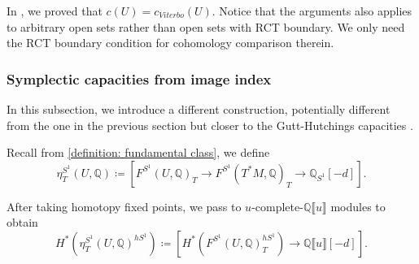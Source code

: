 \documentclass[11pt]{amsart}
\numberwithin{equation}{section}
\theoremstyle{plain}
\theoremstyle{definition}
\theoremstyle{remark}
\newcommand{\bQ} { {\mathbb{Q}}}
\newcommand{\fpw}[1]{{\llbracket #1\rrbracket}}
\begin{document}
In \cite[Corollary 1.3]{Hochschild-Kuo-Shende-Zhang}, we proved that $c(U)=c_{Viterbo}(U)$. Notice that the arguments also applies to arbitrary open sets rather than open sets with RCT boundary. We only need the RCT boundary condition for cohomology comparison therein. 

\subsubsection{Symplectic capacities from image index}\label{section: capacity from image index}
In this subsection, we introduce a different construction, potentially different from the one in the previous section but closer to the Gutt-Hutchings capacities \cite{gutthutchings2018capacities}.

Recall from \autoref{definition: fundamental class}, we define 
\[\eta^{S^1}_T(U,\bQ) \coloneqq \left[F^{S^1}(U,\bQ)_{T} \rightarrow F^{S^1}(T^*M,\bQ)_{T}\rightarrow \bQ_{{S^1}}[-d]\right].\]

After taking homotopy fixed points, we pass to $u$-complete-$\bQ\fpw{u}$ modules to obtain  
\[H^*(\eta^{S^1}_T(U,\bQ)^{hS^1})\coloneqq \left[H^*(F^{S^1}(U,\bQ)_{T} ^{hS^1})\rightarrow \bQ\fpw{u}[-d]\right].\]
\end{document}
